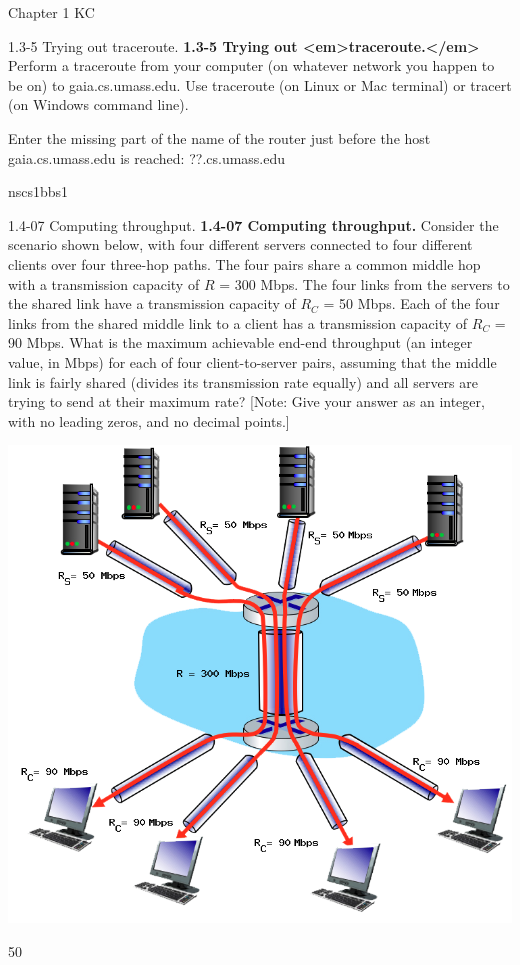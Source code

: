 \documentclass[a4paper]{article}
\begin{document}
\begin{quiz}{Chapter 1 KC}
\begin{shortanswer}[points=1]{1.3-5 Trying out traceroute.}
\textbf{1.3-5 Trying out <em>traceroute.</em>} 
Perform a traceroute from your computer (on whatever network you happen to be on) to gaia.cs.umass.edu. Use traceroute (on Linux or Mac terminal) or tracert (on Windows command line). 

Enter the missing part of the name of the router just before the host gaia.cs.umass.edu is reached: ??.cs.umass.edu
\item* nscs1bbs1
\end{shortanswer}

\begin{shortanswer}[points=1]{1.4-07 Computing throughput.}
\textbf{1.4-07 Computing throughput.} 
Consider the scenario shown below, with four different servers connected to four different clients over four three-hop paths. The four pairs share a common middle hop with a transmission capacity of $R$ = 300 Mbps. The four links from the servers to the shared link have a transmission capacity of $R_C$ = 50 Mbps. Each of the four links from the shared middle link to a client has a transmission capacity of $R_C$ = 90 Mbps. What is the maximum achievable end-end throughput (an integer value, in Mbps) for each of four client-to-server pairs, assuming that the middle link is fairly shared (divides its transmission rate equally) and all servers are trying to send at their maximum rate? 
[Note: Give your answer as an integer, with no leading zeros, and no decimal points.] 
\begin{center}
\includegraphics[width=\linewidth]{figs/1.4.7.png}
\end{center}
\item* 50
\end{shortanswer}


\end{quiz}
\end{document}

